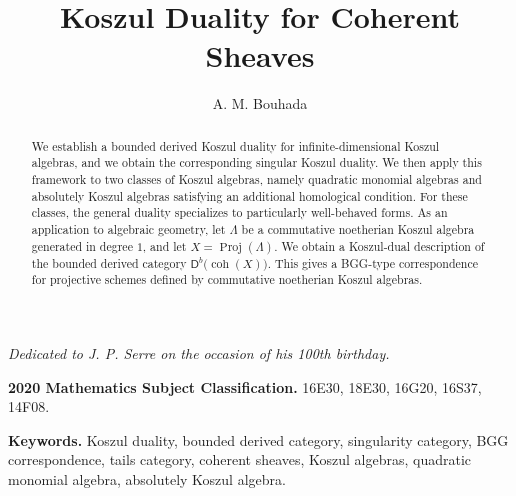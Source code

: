 \documentclass[11pt]{article}
\title{Koszul Duality for Coherent Sheaves}
\author{
A. M.  Bouhada
}
\date{}
\theoremstyle{definition}
\theoremstyle{remark}
\begin{document}
\maketitle
\begin{center}
\emph{Dedicated to J. P. Serre on the occasion of his 100th birthday.}
\end{center}
\begin{abstract} We establish a bounded derived Koszul duality for infinite-dimensional Koszul algebras, and we obtain the corresponding singular Koszul duality. We then apply this framework to two classes of Koszul algebras, namely quadratic monomial algebras and absolutely Koszul algebras satisfying an additional homological condition. For these classes, the general duality specializes to particularly well-behaved forms. As an application to algebraic geometry, let \(\Lambda\) be a commutative noetherian Koszul algebra generated in degree \(1\), and let \(X=\operatorname{Proj}(\Lambda)\). We obtain a Koszul-dual description of the bounded derived category \(\mathsf{D}^{b}\!\bigl(\operatorname{coh}(X)\bigr)\). This gives a BGG-type correspondence for projective schemes defined by commutative noetherian Koszul algebras. \end{abstract}
\begin{center}
\tableofcontents
\end{center}
\noindent \textbf{2020 Mathematics Subject Classification.}
16E30, 18E30, 16G20, 16S37, 14F08.

\noindent \textbf{Keywords.}
Koszul duality, bounded derived category, singularity category, BGG correspondence,
tails category, coherent sheaves, Koszul algebras, quadratic
monomial algebra, absolutely Koszul algebra.
\end{document}
